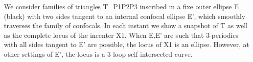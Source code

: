 We consider families of triangles T=P1P2P3 inscribed in a fixe outer ellipse E (black) with two sides tangent to an internal confocal ellipse E', which smoothly traverses the family of confocals. In each instant we show a snapshot of T as well as the complete locus of the incenter X1. When E,E' are such that 3-periodics with all sides tangent to E' are possible, the locus of X1 is an ellipse. However, at other settings of E', the locus is a 3-loop self-intersected curve.